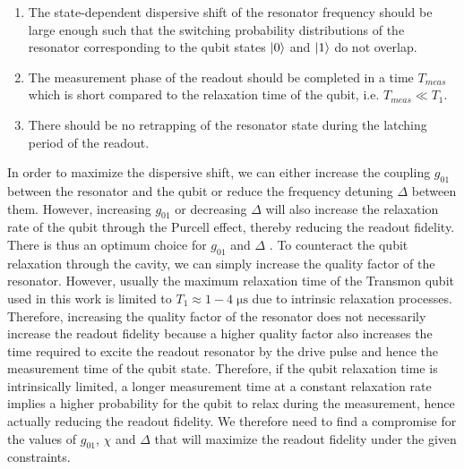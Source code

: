 \begin{enumerate}
\item The state-dependent dispersive shift of the resonator frequency should be large enough such that the switching probability distributions of the resonator corresponding to the qubit states $\left| 0 \right>$ and $\left| 1 \right>$ do not overlap.
\item The measurement phase of the readout should be completed in a time $T_{meas}$ which is short compared to the relaxation time of the qubit, i.e. $T_{meas}\ll T_1$.
\item There should be no retrapping of the resonator state during the latching period of the readout.
\end{enumerate}

In order to maximize the dispersive shift, we can either increase the coupling $g_{01}$ between the resonator and the qubit or reduce the frequency detuning $\Delta$ between them. However, increasing $g_{01}$ or decreasing $\Delta$ will also increase the relaxation rate of the qubit through the Purcell effect, thereby reducing the readout fidelity. There is thus an optimum choice for $g_{01}$ and $\Delta$ \citep{mallet_single-shot_2009}. To counteract the qubit relaxation through the cavity, we can simply increase the quality factor of the resonator. However, usually the maximum relaxation time of the Transmon qubit used in this work is limited to $T_1\approx 1-4\;\mathrm{\mu s}$ due to intrinsic relaxation processes. Therefore, increasing the quality factor of the resonator does not necessarily increase the readout fidelity because a higher quality factor also increases the time required to excite the readout resonator by the drive pulse and hence the measurement time of the qubit state. Therefore, if the qubit relaxation time is intrinsically limited, a longer measurement time at a constant relaxation rate implies a higher probability for the qubit to relax during the measurement, hence actually reducing the readout fidelity. We therefore need to find a compromise for the values of $g_{01}$, $\chi$ and $\Delta$ that will maximize the readout fidelity under the given constraints.

